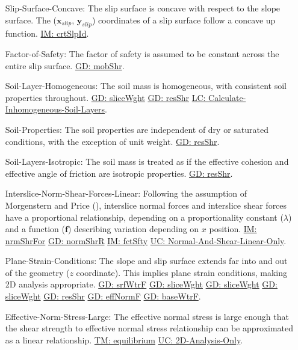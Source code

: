 \documentclass[12pt]{article}
\begin{document}
\begin{itemize}
\item[Slip-Surface-Concave:\phantomsection\label{assumpSSC}]The slip surface is concave with respect to the slope surface. The (${\mathbf{x}_{slip}}$, ${\mathbf{y}_{slip}}$) coordinates of a slip surface follow a concave up function. \hyperref[IM:crtSlpId]{IM: crtSlpId}.
\item[Factor-of-Safety:\phantomsection\label{assumpFOS}]The factor of safety is assumed to be constant across the entire slip surface. \hyperref[GD:mobShr]{GD: mobShr}.
\item[Soil-Layer-Homogeneous:\phantomsection\label{assumpSLH}]The soil mass is homogeneous, with consistent soil properties throughout. \hyperref[GD:sliceWght]{GD: sliceWght} \hyperref[GD:resShr]{GD: resShr} \hyperref[LC_inhomogeneous]{LC: Calculate-Inhomogeneous-Soil-Layers}.
\item[Soil-Properties:\phantomsection\label{assumpSP}]The soil properties are independent of dry or saturated conditions, with the exception of unit weight. \hyperref[GD:resShr]{GD: resShr}.
\item[Soil-Layers-Isotropic:\phantomsection\label{assumpSLI}]The soil mass is treated as if the effective cohesion and effective angle of friction are isotropic properties. \hyperref[GD:resShr]{GD: resShr}.
\item[Interslice-Norm-Shear-Forces-Linear:\phantomsection\label{assumpINSFL}]Following the assumption of Morgenstern and Price (\cite{morgenstern1965}), interslice normal forces and interslice shear forces have a proportional relationship, depending on a proportionality constant ($λ$) and a function ($\mathbf{f}$) describing variation depending on $x$ position. \hyperref[IM:nrmShrFor]{IM: nrmShrFor} \hyperref[GD:normShrR]{GD: normShrR} \hyperref[IM:fctSfty]{IM: fctSfty} \hyperref[UC_normshearlinear]{UC: Normal-And-Shear-Linear-Only}.
\item[Plane-Strain-Conditions:\phantomsection\label{assumpPSC}]The slope and slip surface extends far into and out of the geometry ($z$ coordinate). This implies plane strain conditions, making 2D analysis appropriate. \hyperref[GD:srfWtrF]{GD: srfWtrF} \hyperref[GD:sliceWght]{GD: sliceWght} \hyperref[GD:sliceWght]{GD: sliceWght} \hyperref[GD:sliceWght]{GD: sliceWght} \hyperref[GD:resShr]{GD: resShr} \hyperref[GD:effNormF]{GD: effNormF} \hyperref[GD:baseWtrF]{GD: baseWtrF}.
\item[Effective-Norm-Stress-Large:\phantomsection\label{assumpENSL}]The effective normal stress is large enough that the shear strength to effective normal stress relationship can be approximated as a linear relationship. \hyperref[TM:equilibrium]{TM: equilibrium} \hyperref[UC_2donly]{UC: 2D-Analysis-Only}.

\end{itemize}
\end{document}
